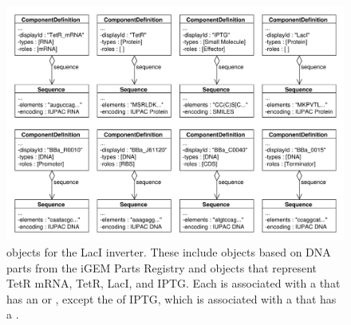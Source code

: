 \begin{figure}[ht]
\begin{center}
\includegraphics[width=\textwidth]{example_uml/toggle_1}
\caption[]{ objects for the LacI inverter. These include  objects based on DNA parts from the iGEM Parts Registry and   objects that represent TetR mRNA, TetR, LacI, and IPTG. Each  is associated with a  that has an  or  , except the  of IPTG, which is associated with a  that has a  .}
\label{uml:ex_comp_defs}
\end{center}
\end{figure}



